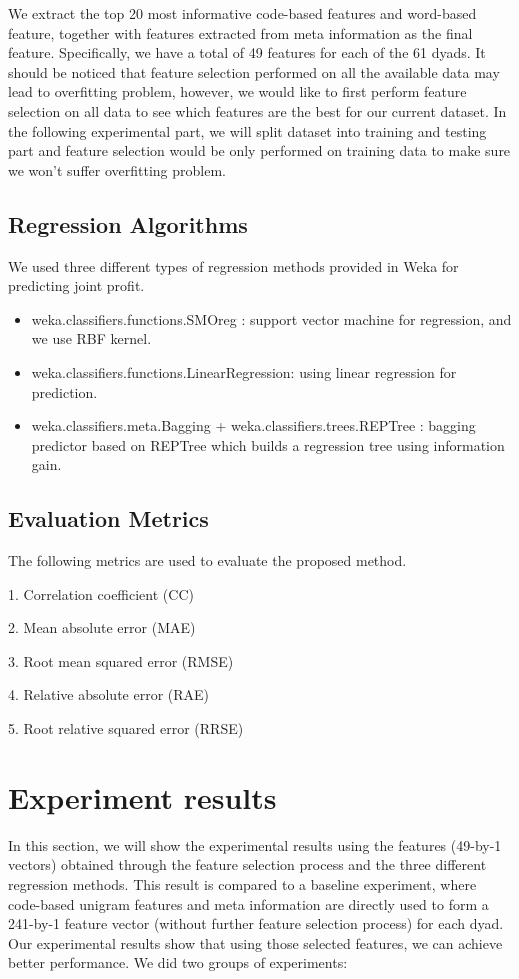 \documentclass[11pt]{article} %
\begin{document}
We extract the top 20 most informative code-based features and word-based feature, together with features extracted from meta information as the final feature. Specifically, we have a total of 49 features for each of the 61 dyads. It should be noticed that feature selection performed on all the available data may lead to overfitting problem, however, we would like to first perform feature selection on all data to see which features are the best for our current dataset. In the following experimental part, we will split dataset into training and testing part and feature selection would be only performed on training data to make sure we won't suffer overfitting problem.

\subsection{Regression Algorithms}
We used three different types of regression methods provided in Weka for predicting joint profit.
\begin{itemize}
\item weka.classifiers.functions.SMOreg \cite{SMO,SVM}: support vector machine for regression, and we use RBF kernel. 
\item weka.classifiers.functions.LinearRegression: using linear regression for prediction.
\item weka.classifiers.meta.Bagging + weka.classifiers.trees.REPTree \cite{bagging}: bagging predictor based on REPTree which builds a regression tree using information gain.
\end{itemize}

\subsection{Evaluation Metrics}
The following metrics are used to evaluate the proposed method.

1. Correlation coefficient (CC)

2. Mean absolute error (MAE)

3. Root mean squared error (RMSE)

4. Relative absolute error (RAE)

5. Root relative squared error (RRSE)


\section{Experiment results}
In this section, we will show the experimental results using the features (49-by-1 vectors) obtained through the feature selection process and the three different regression methods. This result is compared to a baseline experiment, where code-based unigram features and meta information are directly used to form a 241-by-1 feature vector (without further feature selection process) for each dyad. Our experimental results show that using those selected features, we can achieve better performance. We did two groups of experiments:
 
\end{document}

